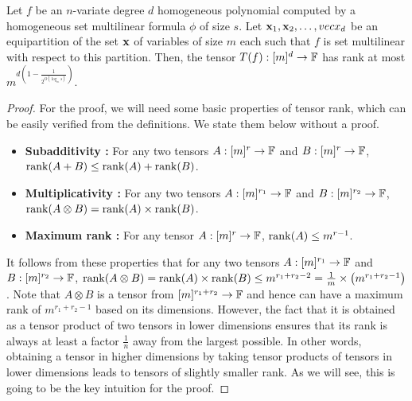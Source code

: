 \begin{lemma}\label{lem:set-multilinear tensor rank}
  Let $f$ be an $n$-variate degree $d$ homogeneous polynomial computed by a homogeneous set multilinear formula $\phi$ of size $s$.
Let $\mathbf{x}_1, \mathbf{x}_2, \ldots, vecx_d$ be an equipartition of the set $\mathbf{x}$ of variables of size $m$ each such that $f$ is set multilinear with respect to this partition.
Then, the tensor $T(f) : [m]^d \rightarrow \mathbb{F}$ has rank at most $m^{d\left(1- \frac{1}{2^{O(\log_m s)}}\right)}$.
\end{lemma}

\begin{proof}
  For the proof, we will need some basic properties of tensor rank, which can be easily verified from the definitions.
We state them below without a proof.
\begin{itemize}
\item {\bf Subadditivity :} For any two tensors $A:[m]^r \rightarrow \mathbb{F}$ and $B:[m]^r \rightarrow \mathbb{F}$, $\operatorname{rank}(A+B) \leq \operatorname{rank}(A) + \operatorname{rank}(B)$.
\item {\bf Multiplicativity :} For any two tensors $A:[m]^{r_1} \rightarrow \mathbb{F}$ and $B:[m]^{r_2} \rightarrow \mathbb{F}$, $\operatorname{rank}(A\otimes B) = \operatorname{rank}(A) \times \operatorname{rank}(B)$.
\item {\bf Maximum rank :} For any tensor $A:[m]^{r} \rightarrow \mathbb{F}$, $\operatorname{rank}(A) \leq m^{r-1}$.  
\end{itemize}

It follows from these properties that for any two tensors $A:[m]^{r_1} \rightarrow \mathbb{F}$ and $B:[m]^{r_2} \rightarrow \mathbb{F}$, $\operatorname{rank}(A\otimes B) = \operatorname{rank}(A) \times \operatorname{rank}(B) \leq m^{r_1 + r_2 -2} = \frac{1}{m}\times \left( m^{r_1 + r_2 -1}\right)$.
Note that $A\otimes B$ is a tensor from $[m]^{r_1 + r_2} \rightarrow \mathbb{F}$ and hence can have a maximum rank of $m^{r_1 + r_2 -1}$ based on its dimensions.
However, the fact that it is obtained as a tensor product of two tensors in lower dimensions ensures that its rank is always at least a factor $\frac{1}{n}$ away from the largest possible.
In other words, obtaining a tensor in higher dimensions by taking tensor products of tensors in lower dimensions leads to tensors of slightly smaller rank.
As we will see, this is going to be the key intuition for the proof.


\end{proof}
